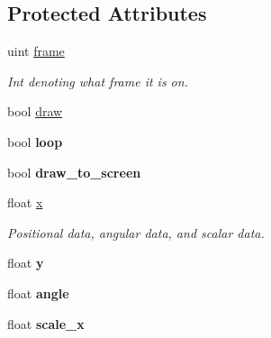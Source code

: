\subsection*{Protected Attributes}
\begin{DoxyCompactItemize}
\item 
\hypertarget{classmob2d__node_a837169b353e6ccdf3b32ebf07f0ce2cc}{
uint \hyperlink{classmob2d__node_a837169b353e6ccdf3b32ebf07f0ce2cc}{frame}}
\label{classmob2d__node_a837169b353e6ccdf3b32ebf07f0ce2cc}

\begin{DoxyCompactList}\small\item\em Int denoting what frame it is on. \item\end{DoxyCompactList}\item 
bool \hyperlink{classmob2d__node_ae43d11a45a33e0d7850b24fc71a9ef86}{draw}
\item 
\hypertarget{classmob2d__node_a1fcf7b35b3172de7c65abc03d6e438c0}{
bool {\bfseries loop}}
\label{classmob2d__node_a1fcf7b35b3172de7c65abc03d6e438c0}

\item 
\hypertarget{classmob2d__node_a7950414d52798272bb172d7bbae88bef}{
bool {\bfseries draw\_\-to\_\-screen}}
\label{classmob2d__node_a7950414d52798272bb172d7bbae88bef}

\item 
\hypertarget{classmob2d__node_a394acbefd5c05e95d7c417ce3d5946a6}{
float \hyperlink{classmob2d__node_a394acbefd5c05e95d7c417ce3d5946a6}{x}}
\label{classmob2d__node_a394acbefd5c05e95d7c417ce3d5946a6}

\begin{DoxyCompactList}\small\item\em Positional data, angular data, and scalar data. \item\end{DoxyCompactList}\item 
\hypertarget{classmob2d__node_a7dc4c708549dea698b1dd11a02ba8636}{
float {\bfseries y}}
\label{classmob2d__node_a7dc4c708549dea698b1dd11a02ba8636}

\item 
\hypertarget{classmob2d__node_a5bca0442fb1981fee972ace4459e430e}{
float {\bfseries angle}}
\label{classmob2d__node_a5bca0442fb1981fee972ace4459e430e}

\item 
\hypertarget{classmob2d__node_ae894dbd1dbe16600f1f65b3cdb1f678b}{
float {\bfseries scale\_\-x}}
\label{classmob2d__node_ae894dbd1dbe16600f1f65b3cdb1f678b}


\end{DoxyCompactItemize}
